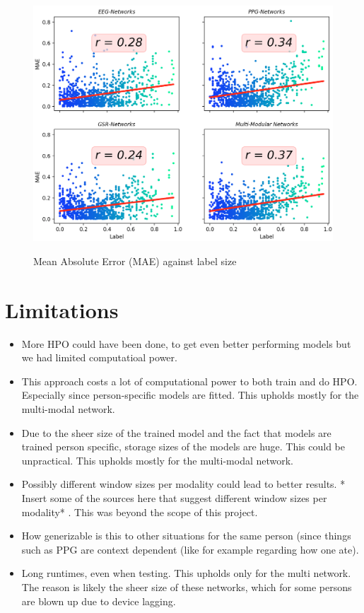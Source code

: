 \documentclass[12pt]{article}
\begin{document}
\newpage

\begin{figure}
\caption{Mean Absolute Error (MAE) against label size}
\bigskip
\includegraphics[scale=0.67]{mae_scatter.png}
\label{fig:mae_scatter}
\end{figure}
\restoregeometry

\section{Limitations}

\begin{itemize}
  \item  More HPO could have been done, to get even better performing models but we had limited computatioal power.   
  \item This approach costs a lot of computational power to both train and do HPO. Especially since person-specific models are fitted. This upholds mostly for the multi-modal network.
  \item Due to the sheer size of the trained model and the fact that models are trained person specific, storage sizes of the models are huge. This could be unpractical.  This upholds mostly for the multi-modal network.
  \item Possibly different window sizes per modality could lead to better results.  * Insert some of the sources here that suggest different window sizes per modality* . This was beyond the scope of this project.
   \item How generizable is this to other situations for the same person (since things such as PPG are context dependent (like for example regarding how one ate).
   \item Long runtimes,  even when testing. This upholds only for the multi network. The reason is likely the sheer size of these networks, which for some persons are blown up due to device lagging. 
\end{itemize}





\newpage


\end{document}
